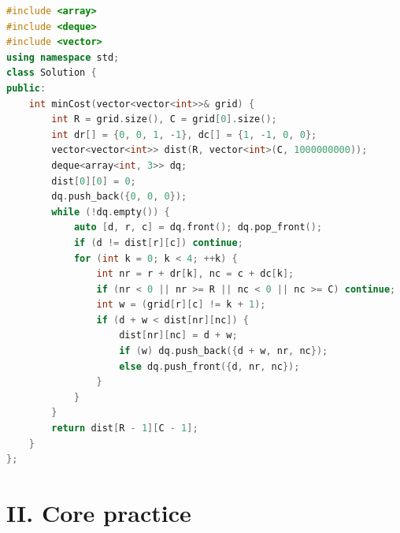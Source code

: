 \documentclass[11pt]{article}
\begin{document}
\begin{lstlisting}[language=C++,caption={P03 --- C++17},label={lst:p03-cpp}]
#include <array>
#include <deque>
#include <vector>
using namespace std;
class Solution {
public:
    int minCost(vector<vector<int>>& grid) {
        int R = grid.size(), C = grid[0].size();
        int dr[] = {0, 0, 1, -1}, dc[] = {1, -1, 0, 0};
        vector<vector<int>> dist(R, vector<int>(C, 1000000000));
        deque<array<int, 3>> dq;
        dist[0][0] = 0;
        dq.push_back({0, 0, 0});
        while (!dq.empty()) {
            auto [d, r, c] = dq.front(); dq.pop_front();
            if (d != dist[r][c]) continue;
            for (int k = 0; k < 4; ++k) {
                int nr = r + dr[k], nc = c + dc[k];
                if (nr < 0 || nr >= R || nc < 0 || nc >= C) continue;
                int w = (grid[r][c] != k + 1);
                if (d + w < dist[nr][nc]) {
                    dist[nr][nc] = d + w;
                    if (w) dq.push_back({d + w, nr, nc});
                    else dq.push_front({d, nr, nc});
                }
            }
        }
        return dist[R - 1][C - 1];
    }
};
\end{lstlisting}

\section*{II. Core practice}
\end{document}
